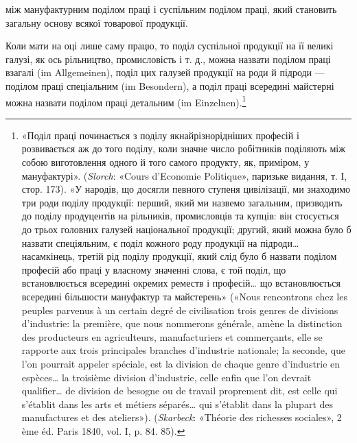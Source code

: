 \parcont{}  %
між мануфактурним поділом праці і суспільним поділом праці,
який становить загальну основу всякої товарової продукції.

Коли мати на оці лише саму працю, то поділ суспільної продукції
на її великі галузі, як ось рільництво, промисловість
і т. д., можна назвати поділом праці взагалі (im Allgemeinen),
поділ цих галузей продукції на роди й підроди — поділом праці
спеціальним (im Besondern), а поділ праці всередині майстерні
можна назвати поділом праці детальним (im Einzelnen).\footnote{
«Поділ праці починається з поділу якнайрізнорідніших професій
і розвивається аж до того поділу, коли значне число робітників поділяють
між собою виготовлення одного й того самого продукту, як, приміром,
у мануфактурі». (\emph{Slorch}: «Cours d’Economie Politique», паризьке
видання, т. І, стор. 173). «У народів, що досягли певного ступеня цивілізації,
ми знаходимо три роди поділу продукції: перший, який ми назвемо
загальним, призводить до поділу продуцентів на рільників, промисловців
та купців: він стосується до трьох головних галузей національної
продукції; другий, який можна було б назвати спеціяльним, є поділ
кожного роду продукції на підроди\dots{} насамкінець, третій рід поділу
продукції, який слід було б назвати поділом професій або праці у власному
значенні слова, є той поділ, що встановлюється всередині окремих реместв
і професій\dots{} що встановлюється всередині більшости мануфактур
та майстерень» («Nous rencontrons chez les peuples parvenus à un certain
degré de civilisation trois genres de divisions d’industrie: la première,
que nous nommerons générale, amène la distinction des producteurs en
agriculteurs, manufacturiers et commerçants, elle se rapporte aux trois principales
branches d’industrie nationale; la seconde, que l’on pourrait appeler
spéciale, est la division de chaque genre d’industrie en espèces\dots{} la troisième
division d’industrie, celle enfin que l’on devrait qualifier\dots{} de division
de besogne ou de travail proprement dit, est celle qui s’établit dans les arts
et métiers séparés\dots{} qui s’établit dans la plupart des manufactures et des
ateliers»). (\emph{Skarbeck}: «Théorie des richesses sociales», 2 ème éd. Paris
1840, vol. I, p. 84. 85).
}

